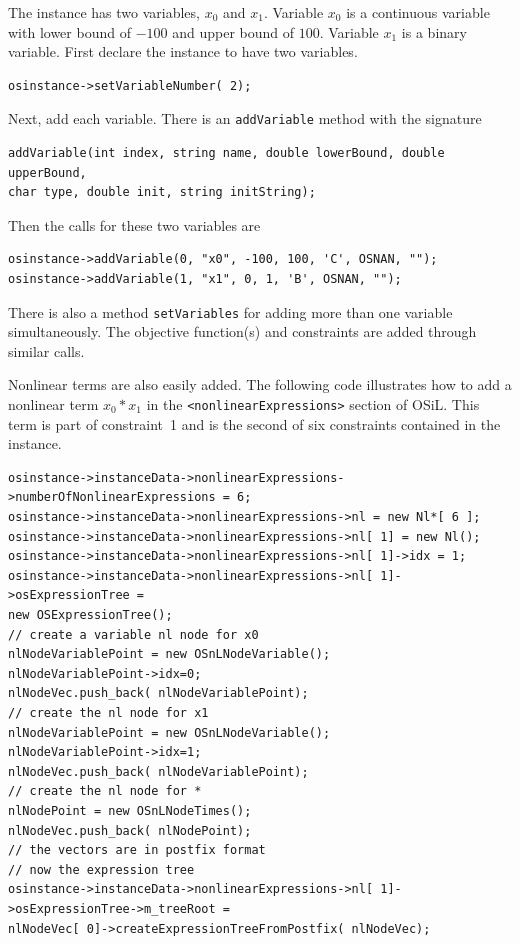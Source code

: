 \documentclass[11pt]{article}
\renewcommand{\_}{{\char"5F}}
\renewcommand{\{}{{\char"7B}}
\renewcommand{\}}{{\char"7D}}
\renewcommand{\^}{{\char"0D}}
\renewcommand{\'}{{\char"0D}}
\begin{document}
\begin{enumerate}[Step 1:]
The instance has two variables, $x_{0}$ and $x_{1}$. Variable $x_{0}$ is a continuous variable with lower bound of $-100$ and upper bound of $100$. Variable $x_{1}$ is a binary variable. First declare the instance to have two variables.
\begin{verbatim}
osinstance->setVariableNumber( 2);
\end{verbatim}
Next, add each variable. There is an {\tt addVariable} method with the signature
\begin{verbatim}
addVariable(int index, string name, double lowerBound, double upperBound,
char type, double init, string initString);
\end{verbatim}
Then the calls for these two variables are
\begin{verbatim}
osinstance->addVariable(0, "x0", -100, 100, 'C', OSNAN, "");
osinstance->addVariable(1, "x1", 0, 1, 'B', OSNAN, "");
\end{verbatim}
There is also a method {\tt setVariables} for adding more than one variable simultaneously.  The objective function(s) and constraints are added through similar calls.

Nonlinear terms are also easily added.  The following code illustrates how to add a nonlinear term
$x_{0}*x_{1}$ in the {\tt <nonlinearExpressions>} section of  OSiL. This term is part of constraint~1
and is the second of six constraints contained in the instance.
\begin{verbatim}
osinstance->instanceData->nonlinearExpressions->numberOfNonlinearExpressions = 6;
osinstance->instanceData->nonlinearExpressions->nl = new Nl*[ 6 ];
osinstance->instanceData->nonlinearExpressions->nl[ 1] = new Nl();
osinstance->instanceData->nonlinearExpressions->nl[ 1]->idx = 1;
osinstance->instanceData->nonlinearExpressions->nl[ 1]->osExpressionTree =
new OSExpressionTree();
// create a variable nl node for x0
nlNodeVariablePoint = new OSnLNodeVariable();
nlNodeVariablePoint->idx=0;
nlNodeVec.push_back( nlNodeVariablePoint);
// create the nl node for x1
nlNodeVariablePoint = new OSnLNodeVariable();
nlNodeVariablePoint->idx=1;
nlNodeVec.push_back( nlNodeVariablePoint);
// create the nl node for *
nlNodePoint = new OSnLNodeTimes();
nlNodeVec.push_back( nlNodePoint);
// the vectors are in postfix format
// now the expression tree
osinstance->instanceData->nonlinearExpressions->nl[ 1]->osExpressionTree->m_treeRoot =
nlNodeVec[ 0]->createExpressionTreeFromPostfix( nlNodeVec);
\end{verbatim}



\end{enumerate}
\end{document}
